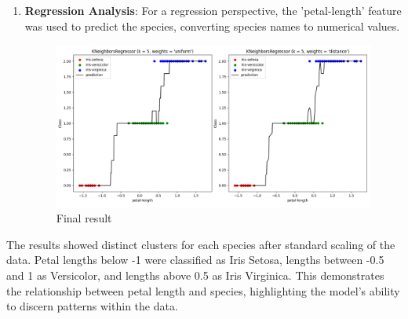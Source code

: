 \documentclass[a4paper]{article}
\begin{document}
\begin{enumerate}
\item \textbf{Regression Analysis}: For a regression perspective, the 'petal-length' feature was used to predict the species, converting species names to numerical values.
	\begin{figure}[h]
		\centering
		\includegraphics[width=1\textwidth]{picture/KNN_Regression_petal}
		\caption{Final result}
		\label{fig:example}
	\end{figure}
\end{enumerate}
 The results showed distinct clusters for each species after standard scaling of the data. Petal lengths below -1 were classified as Iris Setosa, lengths between -0.5 and 1 as Versicolor, and lengths above 0.5 as Iris Virginica. This demonstrates the relationship between petal length and species, highlighting the model's ability to discern patterns within the data.
\end{document}
